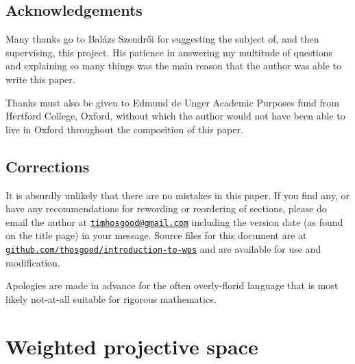 \documentclass[10pt,notitlepage]{article}
\numberwithin{equation}{subsection}
\begin{document}



    \subsection{Acknowledgements} %
    \label{sub:acknowledgements}

    Many thanks go to Balázs Szendrői for suggesting the subject of, and then supervising, this project.
    His patience in answering my multitude of questions and explaining so many things was the main reason that the author was able to write this paper.

    Thanks must also be given to Edmund de Unger Academic Purposes fund from Hertford College, Oxford, without which the author would not have been able to live in Oxford throughout the composition of this paper.




    \subsection{Corrections} %
    \label{sub:corrections}
    
    It is absurdly unlikely that there are no mistakes in this paper.
    If you find any, or have any recommendations for rewording or reordering of sections, please do email the author at \href{mailto:timhosgood@gmail.com?subject=RE:%20An%20Introduction%20to%20Weighted%20Projective%20Space}{\texttt{timhosgood@gmail.com}} including the version date (as found on the title page) in your message.
    Source files for this document are at \href{https://github.com/thosgood/introduction-to-wps}{\texttt{github.com/thosgood/introduction-to-wps}} and are available for use and modification.


    \bigskip

    Apologies are made in advance for the often overly-florid language that is most likely not-at-all suitable for rigorous mathematics.




\section{Weighted projective space} %
\label{sec:weighted_projective_space}
\end{document}
